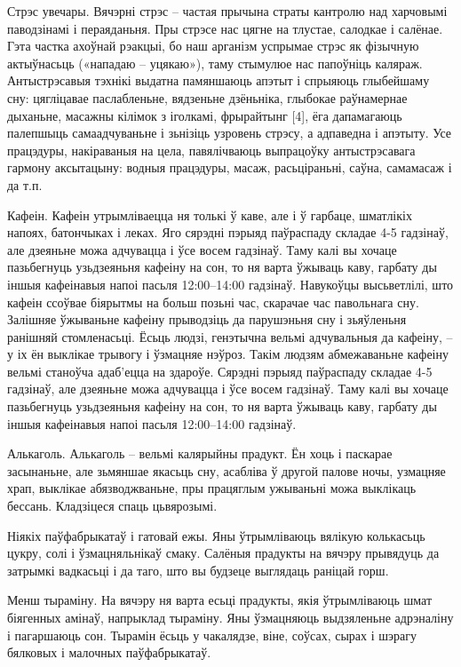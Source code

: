 Стрэс увечары.
Вячэрні стрэс – частая прычына страты кантролю над харчовымі паводзінамі і пераяданьня. Пры стрэсе нас цягне на тлустае, салодкае і салёнае. Гэта частка ахоўнай рэакцыі, бо наш арганізм успрымае стрэс як фізычную актыўнасьць («нападаю – уцякаю»), таму стымулюе нас папоўніць каляраж. Антыстрэсавыя тэхнікі выдатна памяншаюць апэтыт і спрыяюць глыбейшаму сну: цягліцавае паслабленьне, вядзеньне дзёньніка, глыбокае раўнамернае дыханьне, масажны кілімок з іголкамі, фрырайтынг [4], ёга дапамагаюць палепшыць самаадчуваньне і зьнізіць узровень стрэсу, а адпаведна і апэтыту. Усе працэдуры, накіраваныя на цела, павялічваюць выпрацоўку антыстрэсавага гармону аксытацыну: водныя працэдуры, масаж, расьціраньні, саўна, самамасаж і да т.п.

Кафеін.
Кафеін утрымліваецца ня толькі ў каве, але і ў гарбаце, шматлікіх напоях, батончыках і леках. Яго сярэдні пэрыяд паўраспаду складае 4-5 гадзінаў, але дзеяньне можа адчувацца і ўсе восем гадзінаў. Таму калі вы хочаце пазьбегнуць узьдзеяньня кафеіну на сон, то ня варта ўжываць каву, гарбату ды іншыя кафеінавыя напоі пасьля 12:00–14:00 гадзінаў. Навукоўцы высьветлілі, што кафеін ссоўвае біярытмы на больш позьні час, скарачае час павольнага сну. Залішняе ўжываньне кафеіну прыводзіць да парушэньня сну і зьяўленьня ранішняй стомленасьці. Ёсьць людзі, генэтычна вельмі адчувальныя да кафеіну, – у іх ён выклікае трывогу і ўзмацняе нэўроз. Такім людзям абмежаваньне кафеіну вельмі станоўча адаб'ецца на здароўе.
Сярэдні пэрыяд паўраспаду складае 4-5 гадзінаў, але дзеяньне можа адчувацца і ўсе восем гадзінаў. Таму калі вы хочаце пазьбегнуць узьдзеяньня кафеіну на сон, то ня варта ўжываць каву, гарбату ды іншыя кафеінавыя напоі пасьля 12:00–14:00 гадзінаў.

Алькаголь.
Алькаголь – вельмі калярыйны прадукт. Ён хоць і паскарае засынаньне, але зьмяншае якасьць сну, асабліва ў другой палове ночы, узмацняе храп, выклікае абязводжваньне, пры працяглым ужываньні можа выклікаць бессань. Кладзіцеся спаць цьвярозымі.

Ніякіх паўфабрыкатаў і гатовай ежы.
Яны ўтрымліваюць вялікую колькасьць цукру, солі і ўзмацняльнікаў смаку. Салёныя прадукты на вячэру прывядуць да затрымкі вадкасьці і да таго, што вы будзеце выглядаць раніцай горш.

Менш тыраміну.
На вячэру ня варта есьці прадукты, якія ўтрымліваюць шмат біягенных амінаў, напрыклад тыраміну. Яны ўзмацняюць выдзяленьне адрэналіну і пагаршаюць сон. Тырамін ёсьць у чакалядзе, віне, соўсах, сырах і шэрагу бялковых і малочных паўфабрыкатаў.

